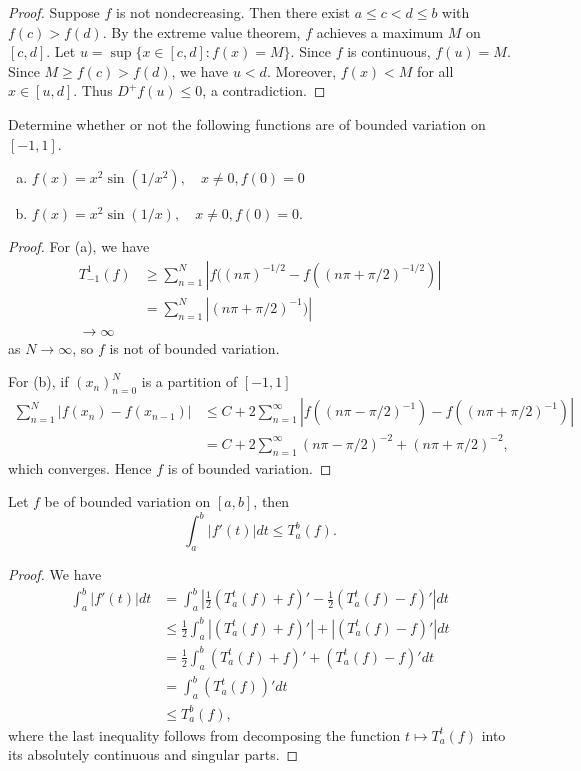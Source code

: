 \documentclass{article}
\begin{document}
\begin{proof}
Suppose $f$ is not nondecreasing.  Then there exist $a \le c < d \le b$ with $f(c) > f(d)$. By the extreme value theorem, $f$ achieves a maximum $M$ on $[c,d]$. 
Let $u = \sup\{x \in [c,d] : f(x) = M\}$.  Since $f$ is continuous, $f(u) = M$. Since $M \ge f(c) > f(d)$, we have $u < d$. Moreover, $f(x) < M$ for all $x \in [u,d]$.  Thus $D^+f(u) \le 0$, a contradiction.
\end{proof}



 Determine whether or not the following functions are of bounded variation on $[-1,1]$.
\begin{enumerate}[(a)]
\item $f(x) = x^2 \sin(1/x^2), \quad x \neq 0, f(0) = 0$
\item $f(x) = x^2 \sin(1/x), \quad x \neq 0, f(0) = 0.$
\end{enumerate}

\begin{proof}
For (a), we have 
\begin{align*}
T_{-1}^1(f) & \ge \sum_{n = 1}^N  |f((n \pi)^{-1/2} - f((n \pi + \pi/2)^{-1/2})|
\\ & = \sum_{n = 1}^N  |(n \pi + \pi/2)^{-1})|
\\ \to \infty
\end{align*}
as $N \to \infty$, so $f$ is not of bounded variation.

For (b), if $(x_n)_{n=0}^N$ is a partition of $[-1,1]$
\begin{align*}
\sum_{n = 1}^N  |f(x_n) - f(x_{n-1})| & \le C + 2 \sum_{n = 1}^\infty | f((n\pi - \pi/2)^{-1}) - f((n\pi + \pi/2)^{-1})|
\\ & = C + 2 \sum_{n = 1}^\infty (n\pi - \pi/2)^{-2} + (n\pi + \pi/2)^{-2},
\end{align*}
which converges.  Hence $f$ is of bounded variation.
\end{proof}


 Let $f$ be of bounded variation on $[a,b]$, then 
$$
\int_a^b |f'(t)| dt \le T_a^b(f).
$$

\begin{proof}
We have
\begin{align*}
\int_a^b |f'(t)| dt  & = \int_a^b |\frac 1 2 (T_a^t(f) + f)' -  \frac 1 2 (T_a^t(f) - f)'| dt 
\\ & \le \frac 1 2 \int_a^b |(T_a^t(f) + f)'| +  |(T_a^t(f) - f)'| dt 
\\ & = \frac 1 2 \int_a^b (T_a^t(f) + f)' +  (T_a^t(f) - f)' dt 
\\ & = \int_a^b (T_a^t(f))' dt 
\\ & \le T_a^b(f),
\end{align*}
where the last inequality follows from decomposing the function $t \mapsto T_a^t(f)$ into its absolutely continuous and singular parts.
\end{proof}
\end{document}
